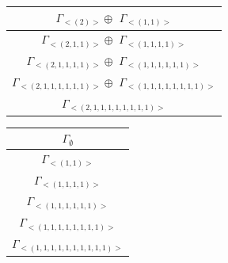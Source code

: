 \begin{minipage}{.6\textwidth}
\centering
\begin{tabular}{|c|}\hline
$\Gamma_{<(
2
)>} \oplus$
$\Gamma_{<(
1 , 
1
)>}$
\\ \hline
$\Gamma_{<(
2 , 
1 , 
1
)>} \oplus$
$\Gamma_{<(
1 , 
1 , 
1 , 
1
)>}$
\\ \hline
$\Gamma_{<(
2 , 
1 , 
1 , 
1 , 
1
)>} \oplus$
$\Gamma_{<(
1 , 
1 , 
1 , 
1 , 
1 , 
1
)>}$
\\ \hline
$\Gamma_{<(
2 , 
1 , 
1 , 
1 , 
1 , 
1 , 
1
)>} \oplus$
$\Gamma_{<(
1 , 
1 , 
1 , 
1 , 
1 , 
1 , 
1 , 
1
)>}$
\\ \hline
$\Gamma_{<(
2 , 
1 , 
1 , 
1 , 
1 , 
1 , 
1 , 
1 , 
1
)>}$
\\
\hline\end{tabular}\end{minipage}
\bigskip
\begin{minipage}{1\textwidth}
\centering
\begin{tabular}{|c|}\hline
$\Gamma_\emptyset$
\\ \hline
$\Gamma_{<(
1 , 
1
)>}$
\\ \hline
$\Gamma_{<(
1 , 
1 , 
1 , 
1
)>}$
\\ \hline
$\Gamma_{<(
1 , 
1 , 
1 , 
1 , 
1 , 
1
)>}$
\\ \hline
$\Gamma_{<(
1 , 
1 , 
1 , 
1 , 
1 , 
1 , 
1 , 
1
)>}$
\\ \hline
$\Gamma_{<(
1 , 
1 , 
1 , 
1 , 
1 , 
1 , 
1 , 
1 , 
1 , 
1
)>}$
\\
\hline\end{tabular}\end{minipage}


